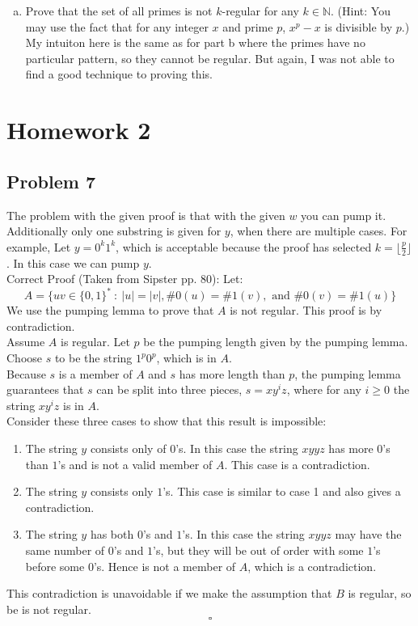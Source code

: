 \documentclass{article}
\begin{document}
\begin{enumerate}[a)]
\item Prove that the set of all primes is not $k$-regular for any $k \in \mathbb{N}$. (Hint: You may use the fact that for any integer $x$ and prime $p$, $x^p - x$ is divisible by $p$.) \\
My intuiton here is the same as for part b where the primes have no particular pattern, so they cannot be regular.
But again, I was not able to find a good technique to proving this.

 \end{enumerate}


 \newpage
 \section*{Homework 2}

 \subsection*{Problem 7}
 The problem with the given proof is that with the given $w$ you can pump it. Additionally
 only one substring is given for $y$, when there are multiple cases. For example,
 Let $y = 0^k1^k$, which is acceptable because the proof has selected $k =
 \lfloor\frac{p}{2}\rfloor$. In this case we can pump $y$. \\[5pt]
 Correct Proof (Taken from Sipster pp. 80):
  Let:
  \[ A = \{uv \in \{0,1\}^* ~:~ |u| = |v|, \#0(u) = \#1(v), \text{ and } \#0(v) = \#1(u) \}\]
  We use the pumping lemma to prove that $A$ is not regular.
  This proof is by contradiction.\\
   Assume $A$ is regular. Let $p$ be the pumping length given by the pumping lemma. \\
   Choose $s$ to be the string $1^p0^p$, which is in $A$. \\
   Because $s$ is a member of $A$ and $s$ has more length than $p$,
  the pumping lemma guarantees that $s$ can be split into three pieces,
  $s = xy^iz$, where for any $i \geq 0$ the string $xy^iz$ is in $A$. \\
       Consider these three cases to show that this result is impossible:

       \begin{enumerate}[1)]
       \item The string $y$ consists only of $0$'s. In this case the string $xyyz$ has more
       $0$'s than $1$'s and is not a valid member of $A$. This case is a contradiction.
       \item The string $y$ consists only $1$'s. This case is similar to case 1 and also gives
       a contradiction.
       \item The string $y$ has both $0$'s and $1$'s. In this case the string $xyyz$ may have
       the same number of $0$'s and $1$'s, but they will be out of order with some $1$'s before
       some $0$'s. Hence is not a member of $A$, which is a contradiction.
       \end{enumerate}

       This contradiction is unavoidable if we make the assumption that $B$ is regular, so be is
       not regular.
       \[\square\]

       
\end{document}
